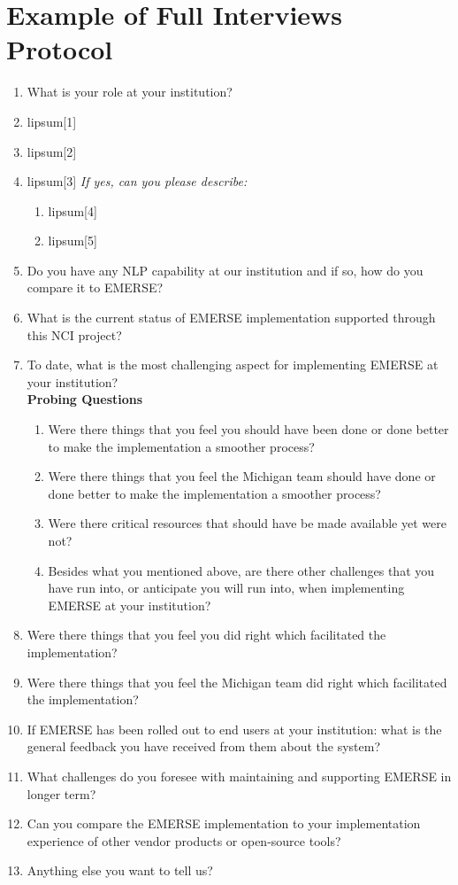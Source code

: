 \section{Example of Full Interviews Protocol}
\label{sec:interview_protocol}
\begin{enumerate}
    \item What is your role at your institution?
    \item lipsum[1]
    \item lipsum[2]
    \item lipsum[3]
        \textit{If yes, can you please describe:}
        \begin{enumerate}
            \item lipsum[4]
            \item lipsum[5]
        \end{enumerate}
    \item Do you have any NLP capability at our institution and if so, how do you compare it to EMERSE?
    \item What is the current status of EMERSE implementation supported through this NCI project?
    \item To date, what is the most challenging aspect for implementing EMERSE at your institution?\\
        \textbf{Probing Questions}
        \begin{enumerate}
            \item Were there things that you feel you should have been done or done better to make the implementation a smoother process?
            \item Were there things that you feel the Michigan team should have done or done better to make the implementation a smoother process?
            \item Were there critical resources that should have be made available yet were not?
            \item Besides what you mentioned above, are there other challenges that you have run into, or anticipate you will run into, when implementing EMERSE at your institution?
        \end{enumerate}
    \item Were there things that you feel you did right which facilitated the implementation?
    \item Were there things that you feel the Michigan team did right which facilitated the implementation?
    \item If EMERSE has been rolled out to end users at your institution: what is the general feedback you have received from them about the system?
    \item What challenges do you foresee with maintaining and supporting EMERSE in longer term?
    \item Can you compare the EMERSE implementation to your implementation experience of other vendor products or open-source tools?
    \item Anything else you want to tell us?
\end{enumerate}

